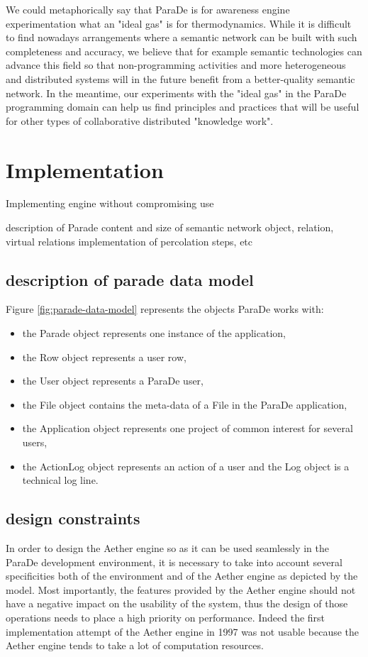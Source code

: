 \documentclass{ecscw2007}
\begin{document}
We could metaphorically say that ParaDe is for awareness engine experimentation what an "ideal gas" is for thermodynamics. While it is difficult to find nowadays arrangements where a semantic network can be built with such completeness and accuracy, we believe that for example semantic technologies can advance this field so that non-programming activities and more heterogeneous and distributed systems will in the future benefit from a better-quality semantic network. In the meantime, our experiments with the "ideal gas" in the ParaDe programming domain can help us find principles and practices that will be useful for other types of collaborative distributed "knowledge work".

\section*{Implementation} 
Implementing engine without compromising use

description of Parade
content and size of semantic network
object, relation, virtual relations
implementation of percolation steps, etc


\subsection*{description of parade data model}

Figure \ref{fig:parade-data-model} represents the objects ParaDe works with:
\begin{itemize}
	\item the Parade object represents one instance of the application,
	\item the Row object represents a user row,
	\item the User object represents a ParaDe user,
	\item the File object contains the meta-data of a File in the ParaDe application,
	\item the Application object represents one project of common interest for several users,
	\item the ActionLog object represents an action of a user and the Log object is a technical log line.
\end{itemize}


\subsection*{design constraints}

In order to design the Aether engine so as it can be used seamlessly in the ParaDe development environment, it is necessary to take into account several specificities both of the environment and of the Aether engine as depicted by the model.
Most importantly, the features provided by the Aether engine should not have a negative impact on the usability of the system, thus the design of those operations needs to place a high priority on performance. Indeed the first implementation attempt of the Aether engine in 1997 was not usable because the Aether engine tends to take a lot of computation resources.
\end{document}
